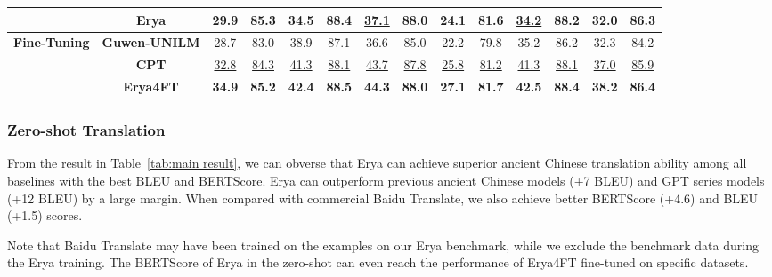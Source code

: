 \begin{table}[h]
{\begin{tabular}{c|c|cc|cc|cc|cc|cc|cc}
    &\textbf{Erya} &\textbf{29.9}&\textbf{85.3}&\textbf{34.5}&\textbf{88.4}&\underline{37.1}&\textbf{88.0}&\textbf{24.1}&\textbf{81.6}&\underline{34.2}&\textbf{88.2}&\textbf{32.0}&\textbf{86.3} \\
    \hline
    \multirow{3}{*}{\textbf{Fine-Tuning}}
    &\textbf{Guwen-UNILM}&28.7&83.0&38.9&87.1&36.6&85.0&22.2&79.8&35.2&86.2&32.3&84.2\\
    &\textbf{CPT} &\underline{32.8}&\underline{84.3}&\underline{41.3}&\underline{88.1}&\underline{43.7}&\underline{87.8}&\underline{25.8}&\underline{81.2}&\underline{41.3}&\underline{88.1}&\underline{37.0}&\underline{85.9} \\
    &\textbf{Erya4FT} &\textbf{34.9}&\textbf{85.2}&\textbf{42.4}&\textbf{88.5}&\textbf{44.3}&\textbf{88.0}&\textbf{27.1}&\textbf{81.7}&\textbf{42.5}&\textbf{88.4}&\textbf{38.2}&\textbf{86.4} \\
    \hline
    \end{tabular}
    }
    \label{tab:my_label}
\end{table}
\subsubsection{Zero-shot Translation}
From the result in Table~\ref{tab:main result}, we can obverse that Erya can achieve superior ancient Chinese translation ability among all baselines with the best BLEU and BERTScore. Erya can outperform previous ancient Chinese models (+7 BLEU) and GPT series models (+12 BLEU) by a large margin. When compared with commercial Baidu Translate, we also achieve better BERTScore (+4.6) and BLEU (+1.5) scores. 

Note that Baidu Translate may have been trained on the examples on our Erya benchmark, while we exclude the benchmark data during the Erya training. The BERTScore of Erya in the zero-shot can even reach the performance of Erya4FT fine-tuned on specific datasets.




